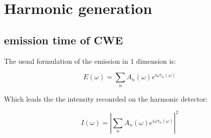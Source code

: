 \chapter{Harmonic generation}

\section{emission time of CWE}

The usual formulation of the emission in 1 dimension is:

\begin{equation}
E(\omega) = \sum_{n}A_n(\omega)e^{i\omega \tau_n(\omega)}
\end{equation}

Which leads the the intensity reconrded on the harmonic detector:

\begin{equation}
I(\omega) = |\sum_{n}A_n(\omega)e^{i\omega \tau_n(\omega)}|^2
\end{equation}
